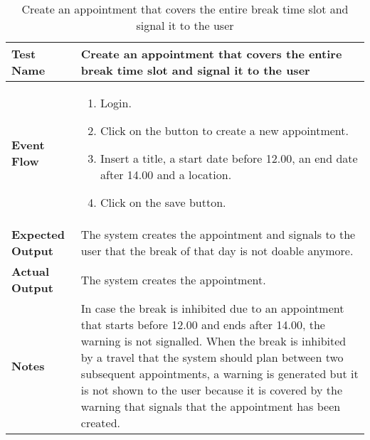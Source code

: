 \begin{table}[h]	
	\centering
	\def\arraystretch{1.5}
	\begin{tabular}{|m{7cm}|m{7cm}|}
		\hline
		\textbf{Test Name}            & Create an appointment that covers the entire break time slot and signal it to the user\\ \hline
		\textbf{Event Flow}             & 
		\begin{enumerate}
			\item Login.
			\item Click on the button to create a new appointment.
			\item Insert a title, a start date before 12.00, an end date after 14.00 and a location.
			\item Click on the save button.
		\end{enumerate} \\ \hline
		\textbf{Expected Output}  &  The system creates the appointment and signals to the user that the break of that day is not doable anymore.  \\ \hline
		\textbf{Actual Output}       & The system creates the appointment.   \\ \hline
		\textbf{Notes} & In case the break is inhibited due to an appointment that starts before 12.00 and ends after 14.00, the warning is not signalled. When the break is inhibited by a travel that the system should plan between two subsequent appointments, a warning is generated but it is not shown to the user because it is covered by the warning that signals that the appointment has been created. \\ \hline
	\end{tabular}
	\caption{Create an appointment that covers the entire break time slot and signal it to the user}
\end{table}



